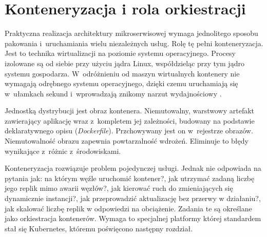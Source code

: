 \section{Konteneryzacja i rola orkiestracji}
\label{sec:konteneryzacja-i-orkiestracja}

Praktyczna realizacja architektury mikroserwisowej wymaga jednolitego sposobu pakowania i~uruchamiania wielu
niezależnych usług. Rolę tę pełni konteneryzacja. Jest to technika wirtualizacji na poziomie systemu operacyjnego.
Procesy izolowane są od siebie przy użyciu jądra Linux, współdzieląc przy tym jądro systemu gospodarza.
W~odróżnieniu od maszyn wirtualnych kontenery nie wymagają odrębnego systemu operacyjnego, dzięki czemu 
uruchamiają się w~ułamkach sekund i~wprowadzają znikomy narzut wydajnościowy \parencite{burns2022}.

Jednostką dystrybucji jest obraz kontenera. Niemutowalny, warstwowy artefakt zawierający aplikację wraz z~kompletem
jej zależności, budowany na podstawie deklaratywnego opisu (\emph{Dockerfile}). Przchowywany jest on w~rejestrze
obrazów. Niemutowalność obrazu zapewnia powtarzalność wdrożeń. Eliminuje to błędy wynikające z~różnic z~środowiskami.

Konteneryzacja rozwiązuje problem pojedynczej usługi. Jednak nie odpowiada na pytania jak: na którym węźle uruchomić kontener?, jak utrzymać zadaną liczbę jego replik mimo awarii
węzłów?, jak kierować ruch do zmieniających się dynamicznie instancji?, jak przeprowadzić aktualizację bez przerwy w działaniu?, jak skalować liczbę replik w odpowiedzi na obciążenie.
Zadania te są określane jako orkiestracja kontenerów. Wymaga to specjalnej platformy której standardem stał się Kubernetes, któremu poświęcono następny rozdział.